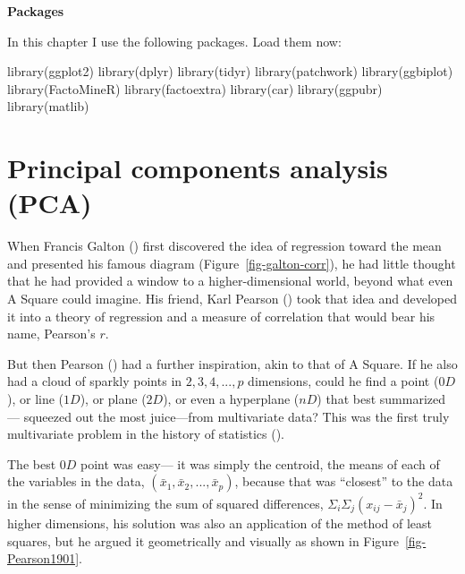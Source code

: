 \documentclass[
  letterpaper,
  10pt,
  krantz2]{krantz}
\makeatletter
\newenvironment{Shaded}{\begin{snugshade}}{\end{snugshade}}
\newcommand{\FunctionTok}[1]{\textcolor[rgb]{0.28,0.35,0.67}{#1}}
\newcommand{\NormalTok}[1]{\textcolor[rgb]{0.00,0.23,0.31}{#1}}
\newenvironment{kframe}{%
  \medskip{}
  \setlength{\fboxsep}{.8em}
  \def\at@end@of@kframe{}%
  \ifinner\ifhmode%
  \def\at@end@of@kframe{\end{minipage}}%
  \begin{minipage}{\columnwidth}%
  \fi\fi%
  \def\FrameCommand##1{\hskip\@totalleftmargin \hskip-\fboxsep
  \colorbox{shadecolor}{##1}\hskip-\fboxsep
      \hskip-\linewidth \hskip-\@totalleftmargin \hskip\columnwidth}%
  \MakeFramed {\advance\hsize-\width
    \@totalleftmargin\z@ \linewidth\hsize
    \@setminipage}}%
{\par\unskip\endMakeFramed%
  \at@end@of@kframe}
\renewenvironment{Shaded}{\begin{kframe}}{\end{kframe}}
\makeatother
\begin{document}
\textbf{Packages}

In this chapter I use the following packages. Load them now:

\begin{Shaded}
\begin{Highlighting}[]
\FunctionTok{library}\NormalTok{(ggplot2)}
\FunctionTok{library}\NormalTok{(dplyr)}
\FunctionTok{library}\NormalTok{(tidyr)}
\FunctionTok{library}\NormalTok{(patchwork)}
\FunctionTok{library}\NormalTok{(ggbiplot)}
\FunctionTok{library}\NormalTok{(FactoMineR)}
\FunctionTok{library}\NormalTok{(factoextra)}
\FunctionTok{library}\NormalTok{(car)}
\FunctionTok{library}\NormalTok{(ggpubr)}
\FunctionTok{library}\NormalTok{(matlib)}
\end{Highlighting}
\end{Shaded}

\section{Principal components analysis (PCA)}\label{sec-pca}

When Francis Galton () first discovered
the idea of regression toward the mean and presented his famous diagram
(Figure~\ref{fig-galton-corr}), he had little thought that he had
provided a window to a higher-dimensional world, beyond what even A
Square could imagine. His friend, Karl Pearson
() took that idea and developed it into
a theory of regression and a measure of correlation that would bear his
name, Pearson's \(r\).

But then Pearson () had a further
inspiration, akin to that of A Square. If he also had a cloud of sparkly
points in \(2, 3, 4, ..., p\) dimensions, could he find a point
(\(0D\)), or line (\(1D\)), or plane (\(2D\)), or even a hyperplane
(\(nD\)) that best summarized --- squeezed out the most juice---from
multivariate data? This was the first truly multivariate problem in the
history of statistics ().

The best \(0D\) point was easy--- it was simply the centroid, the means
of each of the variables in the data,
\((\bar{x}_1, \bar{x}_2, ..., \bar{x}_p)\), because that was ``closest''
to the data in the sense of minimizing the sum of squared differences,
\(\Sigma_i\Sigma_j (x_{ij} - \bar{x}_j)^2\). In higher dimensions, his
solution was also an application of the method of least squares, but he
argued it geometrically and visually as shown in
Figure~\ref{fig-Pearson1901}.
\end{document}
